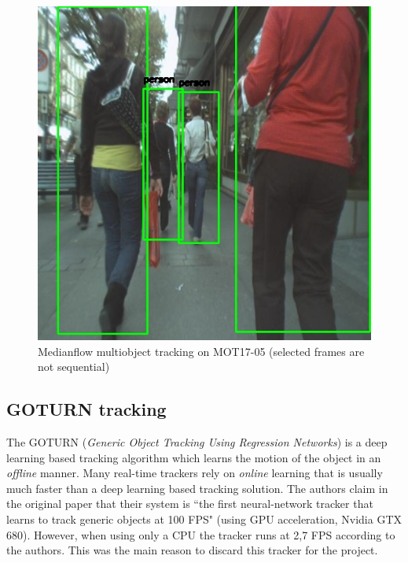 \begin{figure}[H]
\begin{center}
\includegraphics[scale=0.25]{figures/659.jpg}
\caption{Medianflow multiobject tracking on MOT17-05 (selected frames are not sequential)}
\label{fig:medianflow_images}
\end{center}
\end{figure}
\subsection{GOTURN tracking}
The GOTURN (\textit{Generic Object Tracking Using Regression Networks}) is a deep learning based tracking algorithm which learns the motion of the object in an \textit{offline} manner. Many real-time trackers rely on \textit{online} learning that is usually much faster than a deep learning based tracking solution. The authors claim in the original paper \cite{held2016learning} that their system is ``the first neural-network tracker that learns to track generic objects at 100 FPS" (using GPU acceleration, Nvidia GTX 680). However, when using only a CPU the tracker runs at 2,7 FPS according to the authors. This was the main reason to discard this tracker for the project. 

